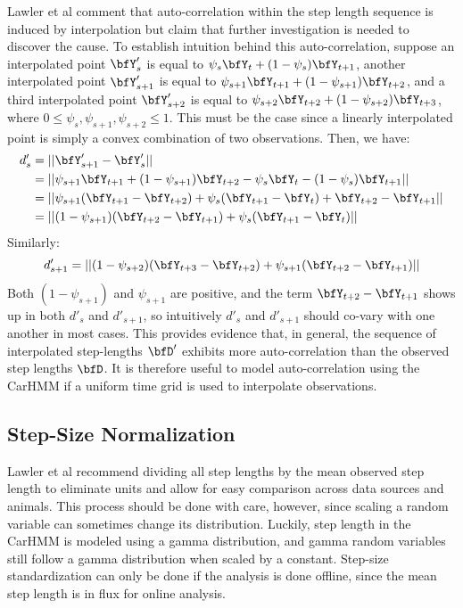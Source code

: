 Lawler et al comment that auto-correlation within the step length sequence is induced by interpolation but claim that further investigation is needed to discover the cause. To establish intuition behind this auto-correlation, suppose an interpolated point $\bfY'_s$ is equal to $\psi_s \bfY_t + (1-\psi_s) \bfY_{t+1}$, another interpolated point $\bfY'_{s+1}$ is equal to $\psi_{s+1} \bfY_{t+1} + (1-\psi_{s+1}) \bfY_{t+2}$, and a third interpolated point $\bfY'_{s+2}$ is equal to $\psi_{s+2} \bfY_{t+2} + (1-\psi_{s+2}) \bfY_{t+3}$, where $0 \leq \psi_s,\psi_{s+1},\psi_{s+2} \leq 1$. This must be the case since a linearly interpolated point is simply a convex combination of two observations. Then, we have:
%
\begin{align*}
	d'_s &= ||\bfY'_{s+1} - \bfY'_s|| \\
	&= ||\psi_{s+1} \bfY_{t+1} + (1-\psi_{s+1}) \bfY_{t+2} - \psi_s \bfY_t - (1-\psi_s) \bfY_{t+1} || \\
	&= ||\psi_{s+1}(\bfY_{t+1} - \bfY_{t+2}) + \psi_s(\bfY_{t+1} - \bfY_t) + \bfY_{t+2} - \bfY_{t+1} ||  \\
	&= ||(1-\psi_{s+1})(\bfY_{t+2} - \bfY_{t+1}) + \psi_s(\bfY_{t+1} - \bfY_t)||
\end{align*}
%
Similarly:
%
$$d'_{s+1} = ||(1-\psi_{s+2})(\bfY_{t+3} - \bfY_{t+2}) + \psi_{s+1}(\bfY_{t+2} - \bfY_{t+1})||$$
%
Both $(1-\psi_{s+1})$ and $\psi_{s+1}$ are positive, and the term $\bfY_{t+2} - \bfY_{t+1}$ shows up in both $d'_s$ and $d'_{s+1}$, so intuitively $d'_s$ and $d'_{s+1}$ should co-vary with one another in most cases. This provides evidence that, in general, the sequence of interpolated step-lengths $\bfD'$ exhibits more auto-correlation than the observed step lengths $\bfD$. It is therefore useful to model auto-correlation using the CarHMM if a uniform time grid is used to interpolate observations.


\subsection{Step-Size Normalization}

Lawler et al recommend dividing all step lengths by the mean observed step length to eliminate units and allow for easy comparison across data sources and animals. This process should be done with care, however, since scaling a random variable can sometimes change its distribution. Luckily, step length in the CarHMM is modeled using a gamma distribution, and gamma random variables still follow a gamma distribution when scaled by a constant. Step-size standardization can only be done if the analysis is done offline, since the mean step length is in flux for online analysis.  
